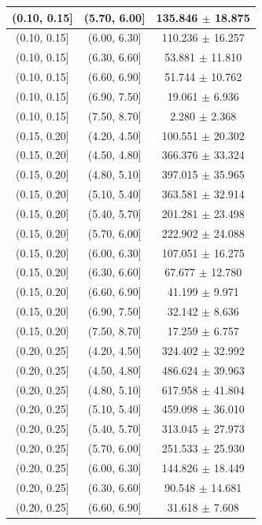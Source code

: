 \begin{longtable}{|c|c|c|}
\hline
(0.10, 0.15] & (5.70, 6.00] & 135.846 $\pm$ 18.875 \\ 
\hline
(0.10, 0.15] & (6.00, 6.30] & 110.236 $\pm$ 16.257 \\ 
\hline
(0.10, 0.15] & (6.30, 6.60] & 53.881 $\pm$ 11.810 \\ 
\hline
(0.10, 0.15] & (6.60, 6.90] & 51.744 $\pm$ 10.762 \\ 
\hline
(0.10, 0.15] & (6.90, 7.50] & 19.061 $\pm$ 6.936 \\ 
\hline
(0.10, 0.15] & (7.50, 8.70] & 2.280 $\pm$ 2.368 \\ 
\hline
(0.15, 0.20] & (4.20, 4.50] & 100.551 $\pm$ 20.302 \\ 
\hline
(0.15, 0.20] & (4.50, 4.80] & 366.376 $\pm$ 33.324 \\ 
\hline
(0.15, 0.20] & (4.80, 5.10] & 397.015 $\pm$ 35.965 \\ 
\hline
(0.15, 0.20] & (5.10, 5.40] & 363.581 $\pm$ 32.914 \\ 
\hline
(0.15, 0.20] & (5.40, 5.70] & 201.281 $\pm$ 23.498 \\ 
\hline
(0.15, 0.20] & (5.70, 6.00] & 222.902 $\pm$ 24.088 \\ 
\hline
(0.15, 0.20] & (6.00, 6.30] & 107.051 $\pm$ 16.275 \\ 
\hline
(0.15, 0.20] & (6.30, 6.60] & 67.677 $\pm$ 12.780 \\ 
\hline
(0.15, 0.20] & (6.60, 6.90] & 41.199 $\pm$ 9.971 \\ 
\hline
(0.15, 0.20] & (6.90, 7.50] & 32.142 $\pm$ 8.636 \\ 
\hline
(0.15, 0.20] & (7.50, 8.70] & 17.259 $\pm$ 6.757 \\ 
\hline
(0.20, 0.25] & (4.20, 4.50] & 324.402 $\pm$ 32.992 \\ 
\hline
(0.20, 0.25] & (4.50, 4.80] & 486.624 $\pm$ 39.963 \\ 
\hline
(0.20, 0.25] & (4.80, 5.10] & 617.958 $\pm$ 41.804 \\ 
\hline
(0.20, 0.25] & (5.10, 5.40] & 459.098 $\pm$ 36.010 \\ 
\hline
(0.20, 0.25] & (5.40, 5.70] & 313.045 $\pm$ 27.973 \\ 
\hline
(0.20, 0.25] & (5.70, 6.00] & 251.533 $\pm$ 25.930 \\ 
\hline
(0.20, 0.25] & (6.00, 6.30] & 144.826 $\pm$ 18.449 \\ 
\hline
(0.20, 0.25] & (6.30, 6.60] & 90.548 $\pm$ 14.681 \\ 
\hline
(0.20, 0.25] & (6.60, 6.90] & 31.618 $\pm$ 7.608 \\ 

\end{longtable}

